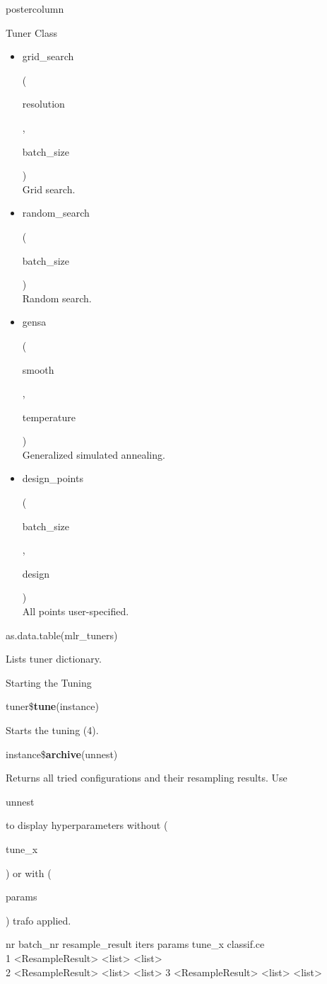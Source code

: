 \documentclass{beamer}
\newcommand{\codeinline}[1]{\begin{codeboxinline}#1\end{codeboxinline}}
\begin{document}
\begin{frame}[fragile]{}
\begin{columns}
\begin{column}{.245\textwidth}
\begin{beamercolorbox}[center]{postercolumn}
\begin{minipage}{.98\textwidth}
{\begin{myblock}{Tuner Class}
							\begin{itemize}
								\item \codeinline{grid\_search}
								(\codeinline{resolution}, \codeinline{batch\_size})\\
								Grid search.
								\item \codeinline{random\_search}
								(\codeinline{batch\_size})\\
								Random search.
								\item \codeinline{gensa}
								(\codeinline{smooth}, \codeinline{temperature})\\
								Generalized simulated annealing.
								\item \codeinline{design\_points}
								(\codeinline{batch\_size }, \codeinline{design})\\
								All points user-specified.
							\end{itemize}
							\vspace{1em}
							\begin{codebox}
								as.data.table(mlr\_tuners)
							\end{codebox}
							Lists tuner dictionary.
						\end{myblock}
						\begin{myblock}{Starting the Tuning}
							\begin{codebox}
								tuner\$\textbf{tune}(instance)
							\end{codebox}
							Starts the tuning (4).
							\\
							\begin{codebox}
								instance\$\textbf{archive}(unnest)
							\end{codebox}
							Returns all tried configurations and their resampling results. 
							Use \codeinline{unnest} to display hyperparameters without
							(\codeinline{tune\_x}) or with (\codeinline{params}) trafo applied.
							\\
							\begin{codeboxmultiline}[width=27cm]
								{\scriptsize 
									nr \space batch\_nr \space resample\_result  iters params tune\_x classif.ce\\
									\phantom{n}1 \space\space\space\space\space{} \space\space <ResampleResult> \space\space\space{} <list> <list> \space 0.2825482\\
									\phantom{n}2 \space\space\space\space\space{} \space\space <ResampleResult> \space\space\space{} <list> <list> 
									\phantom{n}3 \space\space\space\space\space{} \space\space <ResampleResult> \space\space\space{} <list> <list> \space 0.2696206\\
}
\end{codeboxmultiline}
\end{myblock}}
\end{minipage}
\end{beamercolorbox}
\end{column}
\end{columns}
\end{frame}
\end{document}
